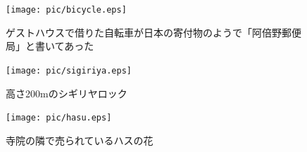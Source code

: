 \begin{figure}[H]
  \begin{minipage}{0.33\hsize}
  \begin{center}
    \texttt{[image: pic/bicycle.eps]}
  \end{center}
  \caption{ゲストハウスで借りた自転車が日本の寄付物のようで「阿倍野郵便局」と書いてあった}
  \end{minipage}
  \begin{minipage}{0.33\hsize}
  \begin{center}
    \texttt{[image: pic/sigiriya.eps]}
  \end{center}
  \caption{高さ200mのシギリヤロック}
  \end{minipage}
  \begin{minipage}{0.33\hsize}
  \begin{center}
    \texttt{[image: pic/hasu.eps]}
  \end{center}
  \caption{寺院の隣で売られているハスの花}
  \end{minipage}
\end{figure}
